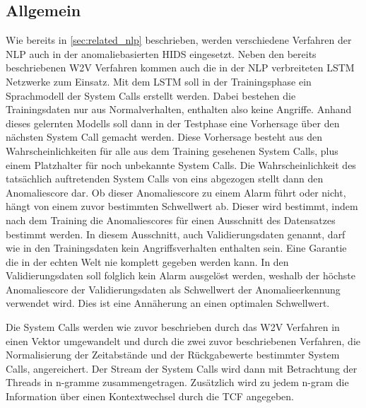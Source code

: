         \subsection{Allgemein}\label{sec:Allgemein}
            Wie bereits in \autoref{sec:related_nlp} beschrieben, werden verschiedene Verfahren der \ac{NLP} auch in der anomaliebasierten \ac{HIDS} eingesetzt.
            Neben den bereits beschriebenen \ac{W2V} Verfahren kommen auch die in der \ac{NLP} verbreiteten \ac{LSTM} Netzwerke zum Einsatz.
            Mit dem \ac{LSTM} soll in der Trainingsphase ein Sprachmodell der System Calls erstellt werden.
            Dabei bestehen die Trainingsdaten nur aus Normalverhalten, enthalten also keine Angriffe.
            Anhand dieses gelernten Modells soll dann in der Testphase eine Vorhersage über den nächsten System Call gemacht werden.
            Diese Vorhersage besteht aus den Wahrscheinlichkeiten für alle aus dem Training gesehenen System Calls, plus einem Platzhalter für noch unbekannte System Calls.
            Die Wahrscheinlichkeit des tatsächlich auftretenden System Calls von eins abgezogen stellt dann den Anomaliescore dar.
            Ob dieser Anomaliescore zu einem Alarm führt oder nicht, hängt von einem zuvor bestimmten Schwellwert ab.
            Dieser wird bestimmt, indem nach dem Training die Anomaliescores für einen Ausschnitt des Datensatzes bestimmt werden.
            In diesem Ausschnitt, auch Validierungsdaten genannt, darf wie in den Trainingsdaten kein Angriffsverhalten enthalten sein.
            Eine Garantie die in der echten Welt nie komplett gegeben werden kann.
            In den Validierungsdaten soll folglich kein Alarm ausgelöst werden, weshalb der höchste Anomaliescore der Validierungsdaten als Schwellwert der Anomalieerkennung verwendet wird.
            Dies ist eine Annäherung an einen optimalen Schwellwert.

            Die System Calls werden wie zuvor beschrieben durch das \ac{W2V} Verfahren in einen Vektor umgewandelt und durch die zwei zuvor beschriebenen Verfahren, die Normalisierung der Zeitabstände und der Rückgabewerte bestimmter System Calls, angereichert.
            Der Stream der System Calls wird dann mit Betrachtung der Threads in n-gramme zusammengetragen.
            Zusätzlich wird zu jedem n-gram die Information über einen Kontextwechsel durch die \ac{TCF} angegeben.

